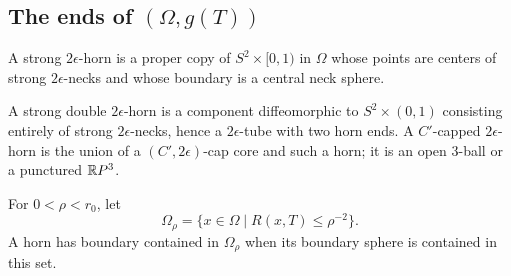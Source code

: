 \subsection{The ends of $(\Omega,g(T))$}
\begin{definition}
\label{def:strong-epsilon-horn}
A strong $2\epsilon$-horn is a proper copy of $S^2\times[0,1)$ in $\Omega$
whose points are centers of strong $2\epsilon$-necks and whose boundary is a
central neck sphere.
\end{definition}
\begin{definition}
\label{def:strong-double-and-capped-horn}
A strong double $2\epsilon$-horn is a component diffeomorphic to
$S^2\times(0,1)$ consisting entirely of strong $2\epsilon$-necks, hence a
$2\epsilon$-tube with two horn ends. A $C'$-capped $2\epsilon$-horn is the
union of a $(C',2\epsilon)$-cap core and such a horn; it is an open
$3$-ball or a punctured $\mathbb{R} P^3$.
\end{definition}
\begin{definition}
\label{def:omega-rho}
For $0<\rho<r_0$, let
$$\Omega_\rho=\{x\in\Omega\mid R(x,T)\le\rho^{-2}\}.$$
A horn has boundary contained in $\Omega_\rho$ when its boundary sphere is
contained in this set.
\end{definition}


